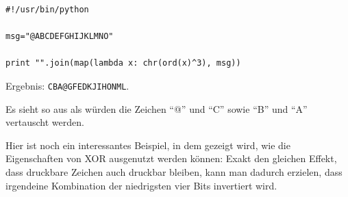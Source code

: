 \begin{lstlisting}
#!/usr/bin/python

msg="@ABCDEFGHIJKLMNO"

print "".join(map(lambda x: chr(ord(x)^3), msg))
\end{lstlisting}

Ergebnis: \verb|CBA@GFEDKJIHONML|.

Es sieht so aus als würden die Zeichen ``@'' und ``C'' sowie ``B'' und ``A'' vertauscht werden.

Hier ist noch ein interessantes Beispiel, in dem gezeigt wird, wie die Eigenschaften von XOR
ausgenutzt werden können: Exakt den gleichen Effekt, dass druckbare Zeichen auch druckbar bleiben,
kann man dadurch erzielen, dass irgendeine Kombination der niedrigsten vier Bits invertiert wird.
